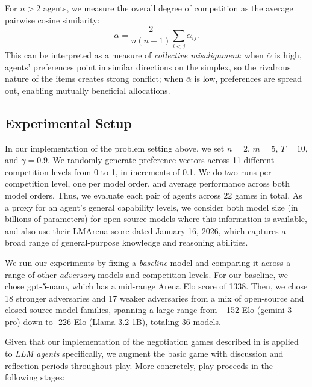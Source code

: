 For $n > 2$ agents, we measure the overall degree of competition as the average pairwise cosine similarity:
\begin{equation}
    \bar{\alpha} = \frac{2}{n(n-1)} \sum_{i < j} \alpha_{ij}.
\end{equation}
This can be interpreted as a measure of \emph{collective misalignment}: when $\bar{\alpha}$ is high, agents' preferences point in similar directions on the simplex, so the rivalrous nature of the items creates strong conflict; when $\bar{\alpha}$ is low, preferences are spread out, enabling mutually beneficial allocations.

\subsection{Experimental Setup}
\label{sec:game_1_experimental_setup}

In our implementation of the problem setting above, we set $n = 2$, $m = 5$, $T = 10$, and $\gamma = 0.9$.
We randomly generate preference vectors across 11 different competition levels from 0 to 1, in increments of 0.1. We do two runs per competition level, one per model order, and average performance across both model orders. 
Thus, we evaluate each pair of agents across 22 games in total.
As a proxy for an agent's general capability levels, we consider both model size (in billions of parameters) for open-source models where this information is available, and also use their LMArena score \citep{chiang2024chatbotarenaopenplatform} dated January 16, 2026, which captures a broad range of general-purpose knowledge and reasoning abilities.

We run our experiments by fixing a \emph{baseline} model and comparing it across a range of other \emph{adversary} models and competition levels.
For our baseline, we chose gpt-5-nano, which has a mid-range Arena Elo score of 1338. Then, we chose 18 stronger adversaries and 17 weaker adversaries from a mix of open-source and closed-source model families, spanning a large range from +152 Elo (gemini-3-pro) down to -226 Elo (Llama-3.2-1B), totaling 36 models. 

Given that our implementation of the negotiation games described in  is applied to \emph{LLM agents} specifically, we augment the basic game with discussion and reflection periods throughout play.
More concretely, play proceeds in the following stages:

